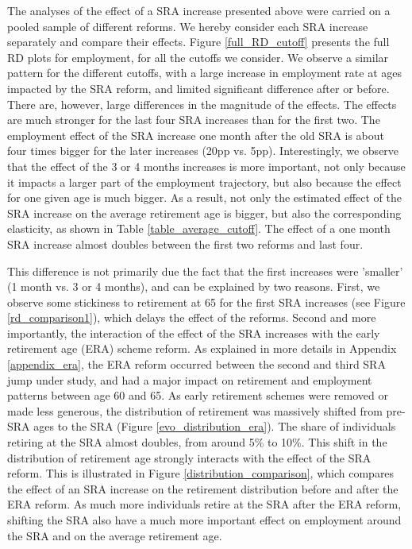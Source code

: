 \documentclass[12pt,a4paper]{article}
\begin{document}
The analyses of the effect of a SRA increase presented above were carried on a pooled sample of different reforms. We hereby consider each SRA increase separately and compare their effects. Figure \ref{full_RD_cutoff} presents the full RD plots for employment, for all the cutoffs we consider. We observe a similar pattern for the different cutoffs, with a large increase in employment rate at ages impacted by the SRA reform, and limited significant difference after or before. There are, however, large differences in the magnitude of the effects. The effects are much stronger for the last four SRA increases than for the first two. The employment effect of the SRA increase one month after the old SRA is about four times bigger for the later increases (20pp vs. 5pp).
Interestingly, we observe that the effect of the 3 or 4 months increases is more important, not only because it impacts a larger part of the employment trajectory, but also because the effect for one given age is much bigger. As a result, not only the estimated effect of the SRA increase on the average retirement age is bigger, but also the corresponding elasticity, as shown in Table \ref{table_average_cutoff}. The effect of a one month SRA increase almost doubles between the first two reforms and last four. 

This difference is not primarily due the fact that the first increases were 'smaller' (1 month vs. 3 or 4 months), and can be explained by two reasons. First, we observe some stickiness to retirement at 65 for the first SRA increases (see Figure \ref{rd_comparison1}), which delays the effect of the reforms. Second and more importantly, the interaction of the effect of the SRA increases with the early retirement age (ERA) scheme reform. As explained in more details in Appendix \ref{appendix_era}, the ERA reform occurred between the second and third SRA jump under study, and had a major impact on retirement and employment patterns between age 60 and 65. As early retirement schemes were removed or made less generous, the distribution of retirement was massively shifted from pre-SRA ages to the SRA (Figure \ref{evo_distribution_era}). The share of individuals retiring at the SRA almost doubles, from around 5\% to 10\%. This shift in the distribution of retirement age strongly interacts with the effect of the SRA reform. This is illustrated in Figure \ref{distribution_comparison}, which compares the effect of an SRA increase on the retirement distribution before and after the ERA reform. As much more individuals retire at the SRA after the ERA reform, shifting the SRA also have a much more important effect on employment around the SRA and on the average retirement age. 
\end{document}
